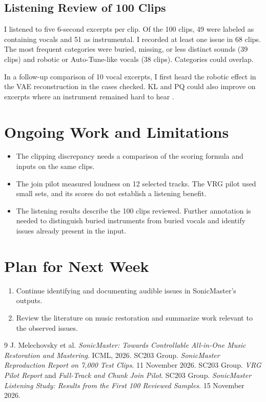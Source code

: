 \documentclass[12pt,a4paper]{article}
\begin{document}
\subsection{Listening Review of 100 Clips}
I listened to five 6-second excerpts per clip. Of the 100 clips, 49 were labeled as containing vocals and 51 as instrumental. I recorded at least one issue in 68 clips. The most frequent categories were buried, missing, or less distinct sounds (39 clips) and robotic or Auto-Tune-like vocals (38 clips). Categories could overlap.

In a follow-up comparison of 10 vocal excerpts, I first heard the robotic effect in the VAE reconstruction in the cases checked. KL and PQ could also improve on excerpts where an instrument remained hard to hear \cite{listening}.

\section{Ongoing Work and Limitations}
\begin{itemize}
  \item The clipping discrepancy needs a comparison of the scoring formula and inputs on the same clips.
  \item The join pilot measured loudness on 12 selected tracks. The VRG pilot used small sets, and its scores do not establish a listening benefit.
  \item The listening results describe the 100 clips reviewed. Further annotation is needed to distinguish buried instruments from buried vocals and identify issues already present in the input.
\end{itemize}

\section{Plan for Next Week}
\begin{enumerate}
  \item Continue identifying and documenting audible issues in SonicMaster's outputs.
  \item Review the literature on music restoration and summarize work relevant to the observed issues.
\end{enumerate}

\begin{thebibliography}{9}
   J. Melechovsky et al. \textit{SonicMaster: Towards Controllable All-in-One Music Restoration and Mastering}. ICML, 2026.
   SC203 Group. \textit{SonicMaster Reproduction Report on 7,000 Test Clips}. 11 November 2026.
   SC203 Group. \textit{VRG Pilot Report} and \textit{Full-Track and Chunk Join Pilot}.
   SC203 Group. \textit{SonicMaster Listening Study: Results from the First 100 Reviewed Samples}. 15 November 2026.
\end{thebibliography}
\end{document}
